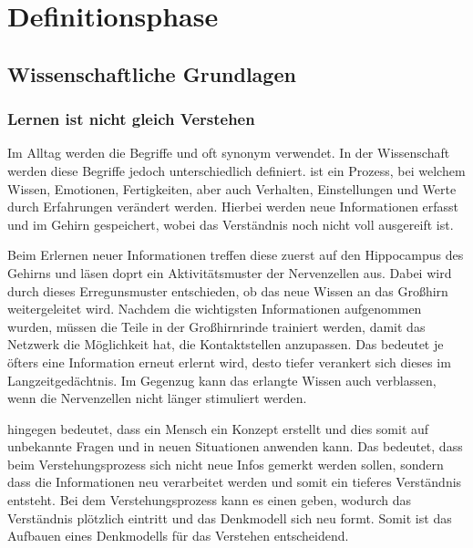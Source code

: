 \section{Definitionsphase}

\subsection{Wissenschaftliche Grundlagen}
\subsubsection{Lernen ist nicht gleich Verstehen}
Im Alltag werden die Begriffe  und  oft synonym verwendet. In der Wissenschaft werden diese Begriffe jedoch unterschiedlich definiert.  ist ein Prozess, bei welchem Wissen, Emotionen, Fertigkeiten, aber auch Verhalten, Einstellungen und Werte durch Erfahrungen verändert werden. Hierbei werden neue Informationen erfasst und im Gehirn gespeichert, wobei das Verständnis noch nicht voll ausgereift ist. \cite*{maier_definition_lernen_nodate} \newline

\noindent
Beim Erlernen neuer Informationen treffen diese zuerst auf den Hippocampus des Gehirns und läsen doprt ein Aktivitätsmuster der Nervenzellen aus. Dabei wird durch dieses Erregunsmuster entschieden, ob das neue Wissen an das Großhirn weitergeleitet wird. Nachdem die wichtigsten Informationen aufgenommen wurden, müssen die Teile in der Großhirnrinde trainiert werden, damit das Netzwerk die Möglichkeit hat, die Kontaktstellen anzupassen. Das bedeutet je öfters eine Information erneut erlernt wird, desto tiefer verankert sich dieses im Langzeitgedächtnis. Im Gegenzug kann das erlangte Wissen auch verblassen, wenn die Nervenzellen nicht länger stimuliert werden. \cite[27]{beck_das_neue_lernen_heißt_verstehen} \newline

\noindent
{} hingegen bedeutet, dass ein Mensch ein Konzept erstellt und dies somit auf unbekannte Fragen und in neuen Situationen anwenden kann. \cite[86]{beck_das_neue_lernen_heißt_verstehen} Das bedeutet, dass beim Verstehungsprozess sich nicht neue Infos gemerkt werden sollen, sondern dass die Informationen neu verarbeitet werden und somit ein tieferes Verständnis entsteht. \cite[113]{beck_das_neue_lernen_heißt_verstehen} Bei dem Verstehungsprozess kann es einen  geben, wodurch das Verständnis plötzlich eintritt und das Denkmodell sich neu formt. Somit ist das Aufbauen eines Denkmodells für das Verstehen entscheidend. \cite[114-115]{beck_das_neue_lernen_heißt_verstehen} \newline 
